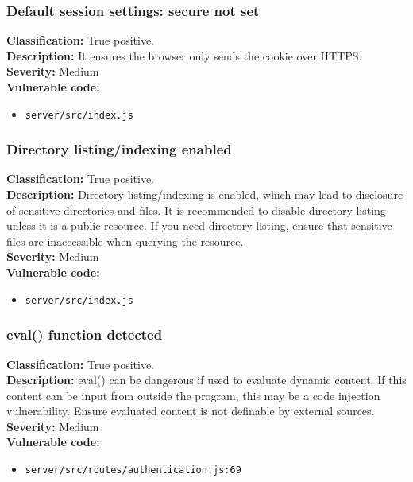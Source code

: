 \documentclass[]{article}
\begin{document}
\subsubsection{Default session settings: secure not set}
\textbf{Classification:} {True positive.} \\
\textbf{Description:} It ensures the browser only sends the cookie over HTTPS. \\
\textbf{Severity:}  Medium\\ 
\textbf{Vulnerable code:}
\begin{itemize}
    \item \texttt{server/src/index.js}
\end{itemize}

\subsubsection{Directory listing/indexing enabled}
\textbf{Classification:} {True positive.} \\
\textbf{Description:} Directory listing/indexing is enabled, which may lead to disclosure of sensitive directories and 
          files. It is recommended to disable directory listing unless it is a public resource. If you need
          directory listing, ensure that sensitive files are inaccessible when querying the resource. \\
\textbf{Severity:}  Medium\\ 
\textbf{Vulnerable code:}
\begin{itemize}
    \item \texttt{server/src/index.js}
\end{itemize}

\subsubsection{eval() function detected}
\textbf{Classification:} {True positive.} \\
\textbf{Description:} eval() can be dangerous if used to evaluate dynamic content. If this content can be input from outside the program, this may be a code injection vulnerability. Ensure evaluated content is not definable by external sources. \\ 
\textbf{Severity:} Medium \\ 
\textbf{Vulnerable code:}
\begin{itemize}
    \item \texttt{server/src/routes/authentication.js:69}
\end{itemize}
\end{document}
